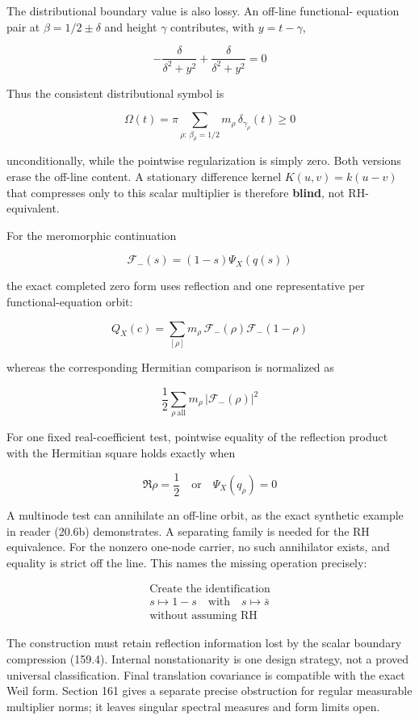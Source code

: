 \documentclass[
  11pt,
]{book}
\begin{document}
The distributional boundary value is also lossy. An off-line functional-
equation pair at \(\beta=1/2\pm\delta\) and height \(\gamma\)
contributes, with \(y=t-\gamma\),

\[
-\frac{\delta}{\delta^2+y^2}
+\frac{\delta}{\delta^2+y^2}=0
\tag{159.3}
\]

Thus the consistent distributional symbol is

\[
\boxed{
\Omega(t)=\pi\sum_{\rho:\,\beta_\rho=1/2}
m_\rho\,\delta_{\gamma_\rho}(t)\ge0}
\tag{159.4}
\]

unconditionally, while the pointwise regularization is simply zero. Both
versions erase the off-line content. A stationary difference kernel
\(K(u,v)=k(u-v)\) that compresses only to this scalar multiplier is
therefore \textbf{blind}, not RH-equivalent.

For the meromorphic continuation

\[
\mathcal F_-(s)=(1-s)\Psi_X(q(s))
\tag{159.5a}
\]

the exact completed zero form uses reflection and one representative per
functional-equation orbit:

\[
Q_X(c)=\sum_{[\rho]}m_\rho\,\mathcal F_-(\rho)\mathcal F_-(1-\rho)
\tag{159.5}
\]

whereas the corresponding Hermitian comparison is normalized as

\[
\frac12\sum_{\rho\ \mathrm{all}}m_\rho\,
|\mathcal F_-(\rho)|^2
\tag{159.6}
\]

For one fixed real-coefficient test, pointwise equality of the
reflection product with the Hermitian square holds exactly when

\[
\boxed{\Re\rho=\frac12\quad\text{or}\quad\Psi_X(q_\rho)=0}
\tag{159.7}
\]

A multinode test can annihilate an off-line orbit, as the exact
synthetic example in reader (20.6b) demonstrates. A separating family is
needed for the RH equivalence. For the nonzero one-node carrier, no such
annihilator exists, and equality is strict off the line. This names the
missing operation precisely:

\[
\boxed{\begin{gathered}
\text{Create the identification}\\
s\mapsto1-s\quad\text{with}\quad s\mapsto\bar s\\
\text{without assuming RH}
\end{gathered}}
\tag{159.8}
\]

The construction must retain reflection information lost by the scalar
boundary compression (159.4). Internal nonstationarity is one design
strategy, not a proved universal classification. Final translation
covariance is compatible with the exact Weil form. Section 161 gives a
separate precise obstruction for regular measurable multiplier norms; it
leaves singular spectral measures and form limits open.
\end{document}
